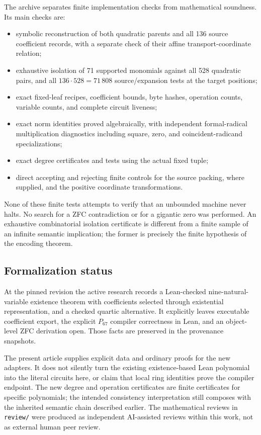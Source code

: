 \documentclass[11pt,a4paper]{article}
\theoremstyle{definition}
\theoremstyle{remark}
\numberwithin{equation}{section}
\begin{document}
The archive separates finite implementation checks from mathematical
soundness. Its main checks are:
\begin{itemize}
\item symbolic reconstruction of both quadratic parents and all 136
source coefficient records, with a separate check of their affine
transport-coordinate relation;
\item exhaustive isolation of 71 supported monomials against all 528
quadratic pairs, and all $136\cdot528=71\,808$ source/expansion tests
at the target positions;
\item exact fixed-leaf recipes, coefficient bounds, byte hashes,
operation counts, variable counts, and complete circuit liveness;
\item exact norm identities proved algebraically, with independent
formal-radical multiplication diagnostics including square, zero, and
coincident-radicand specializations;
\item exact degree certificates and tests using the actual fixed tuple;
\item direct accepting and rejecting finite controls for the source
packing, where supplied, and the positive coordinate transformations.
\end{itemize}
None of these finite tests attempts to verify that an unbounded machine
never halts. No search for a ZFC contradiction or for a gigantic zero
was performed. An exhaustive combinatorial isolation certificate is
different from a finite sample of an infinite semantic implication;
the former is precisely the finite hypothesis of the encoding theorem.

\subsection{Formalization status}

At the pinned revision the active research records a Lean-checked
nine-natural-variable existence theorem with coefficients selected through
existential representation, and a checked quartic alternative. It
explicitly leaves executable coefficient export, the explicit $P_{67}$
compiler correctness in Lean, and an object-level ZFC derivation open.
Those facts are preserved in the provenance snapshots.

The present article supplies explicit data and ordinary proofs for the
new adapters. It does not silently turn the existing existence-based
Lean polynomial into the literal circuits here, or claim that local
ring identities prove the compiler endpoint. The new degree and
operation certificates are finite certificates for specific polynomials;
the intended consistency interpretation still composes with the
inherited semantic chain described earlier. The mathematical reviews
in \texttt{review/} were produced as independent AI-assisted reviews
within this work, not as external human peer review.
\end{document}
